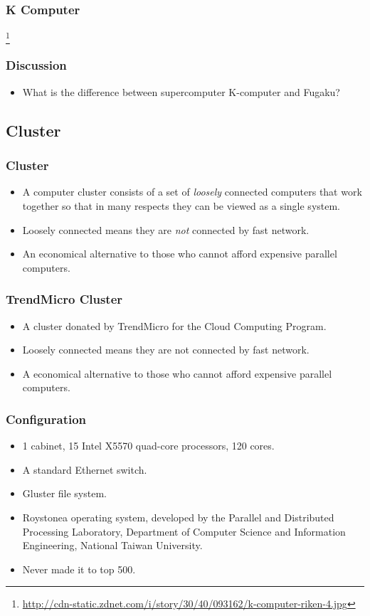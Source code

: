 \documentclass{beamer}
\begin{document}
\begin{CJK}{UTF8}{bsmi}
\begin{frame}
\frametitle{K Computer}
\centerline{}
\footnote{\url{http://cdn-static.zdnet.com/i/story/30/40/093162/k-computer-riken-4.jpg}}
\end{frame}

\begin{frame}
\frametitle{Discussion}
\begin{itemize}
\item What is the difference between supercomputer K-computer and Fugaku?
\end{itemize}
\end{frame}


\subsection{Cluster}

\begin{frame}
\frametitle{Cluster}
\begin{itemize}
\item A computer cluster consists of a set of {\em loosely} connected
  computers that work together so that in many respects they can be
  viewed as a single system.
\item Loosely connected means they are {\em not} connected by fast
  network.
\item An economical alternative to those who cannot afford expensive
  parallel computers.
\end{itemize}
\end{frame}

\begin{frame}
\frametitle{TrendMicro Cluster}
\begin{itemize}
\item A cluster donated by TrendMicro for the Cloud Computing Program.
\item Loosely connected means they are not connected by fast network.
\item A economical alternative to those who cannot afford expensive
  parallel computers.
\end{itemize}
\end{frame}

\begin{frame}
\frametitle{Configuration}
\begin{itemize}
\item 1 cabinet, 15 Intel X5570 quad-core processors, 120 cores.
\item A standard Ethernet switch.
\item Gluster file system.
\item Roystonea operating system, developed by the Parallel and Distributed Processing Laboratory, Department of Computer Science and Information Engineering, National Taiwan University.
\item Never made it to top 500.
\end{itemize}
\end{frame}


\end{CJK}
\end{document}
